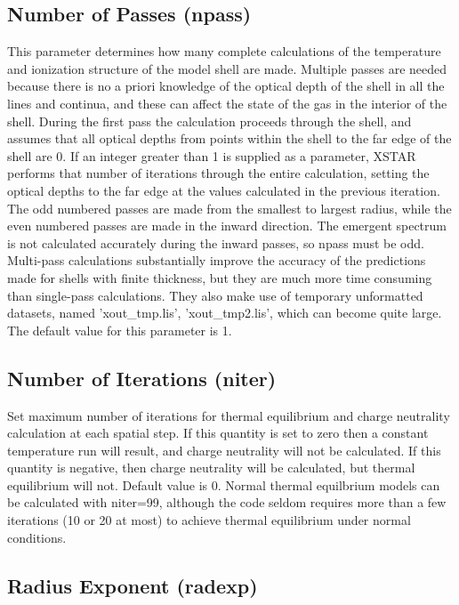 \subsection{Number of Passes (npass)}

This parameter determines how many 
complete calculations of the temperature and ionization 
structure of the model shell are made.
Multiple passes are needed because there is no a priori knowledge of the 
optical depth of the shell in all the lines and continua, and these 
can affect the state of the gas in the interior of the shell.
During the first pass the calculation proceeds  through the shell, and assumes that all
optical depths from points within the shell to the far edge of the shell
are 0.  If an integer greater than 1 is supplied as a parameter,
XSTAR performs that number of iterations through the entire calculation,
setting the optical depths to the far edge at the values calculated in
the previous iteration.  The odd numbered passes 
are made from the smallest to largest radius, while the 
even numbered passes are made in the inward direction.  
The emergent spectrum is not calculated accurately during the inward 
passes, so npass must be odd.
Multi-pass calculations substantially
improve the accuracy of the predictions made for shells with finite
thickness, but they are much more time consuming than
single-pass calculations. They also make use of temporary unformatted datasets, 
named 'xout\_tmp.lis', 'xout\_tmp2.lis', which can become 
quite large.  The default value for this parameter is 1.  

\subsection{Number of Iterations (niter)}  

Set maximum number of iterations for thermal equilibrium and 
charge neutrality calculation at 
each spatial step.    If this quantity is set to zero 
then a constant temperature run will result, and charge neutrality will 
not be calculated.  If this quantity is negative, then charge neutrality will be calculated, but 
thermal equilibrium will not.  Default value is 0.  Normal thermal equilbrium models 
can be calculated with niter=99, although the code seldom requires more than a few iterations 
(10 or 20 at most) to achieve thermal equilibrium under normal conditions.

\subsection{Radius Exponent (radexp)}  

